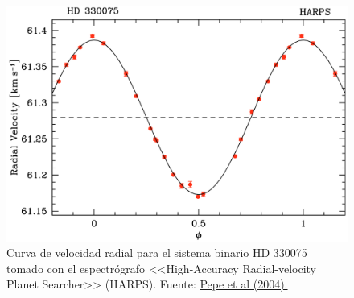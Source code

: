 \begin{figure}[htb]
  \centering
				\includegraphics[width=\textwidth]{figures/spectroscopic-binary-lc.png}
				\caption{Curva de velocidad radial para el sistema binario HD 330075 tomado con el espectrógrafo <<High-Accuracy Radial-velocity Planet
Searcher>> (HARPS). Fuente: \href{https://www.aanda.org/articles/aa/abs/2004/31/aa0389-04/aa0389-04.html}{Pepe et al (2004).}}
				\label{fig:lc-scb} 
\end{figure}

